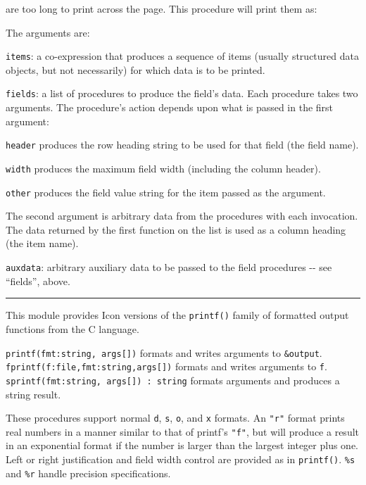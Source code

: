 are too long to print across the page. This procedure will print them
as:


The arguments are:

\texttt{items}: a co-expression that produces a sequence of items
(usually structured data objects, but not necessarily) for which data
is to be printed.

\texttt{fields}: a list of procedures to produce the
field's data. Each procedure takes two arguments. The
procedure's action depends upon what is passed in the
first argument:

\texttt{header} produces the row heading string to be used for that
field (the field name).

\texttt{width} produces the maximum field width (including the column
header).

\texttt{other} produces the field value string for the item passed as
the argument.

The second argument is arbitrary data from the procedures with each
invocation. The data returned by the first function on the list is used
as a column heading (the item name).

\texttt{auxdata}: arbitrary auxiliary data to be passed to the field
procedures -{}- see ``fields'', above.

\vspace{0.25cm}\hrule{}

This module provides Icon versions of the
\texttt{printf()} family of formatted output functions
from the C language.

\texttt{printf(fmt:string, args[])} formats and writes arguments to
\texttt{\&output}.\\
\texttt{fprintf(f:file,fmt:string,args[])} formats and writes arguments
to \texttt{f}.\\
\texttt{sprintf(fmt:string, args[]) : string} formats arguments and
produces a string result.

These procedures support normal \texttt{d}, \texttt{s}, \texttt{o}, and
\texttt{x} formats. An \texttt{"r"} format
prints real numbers in a manner similar to that of
printf's \texttt{"f"}, but
will produce a result in an exponential format if the number is larger
than the largest integer plus one. Left or right justification and
field width control are provided as in \texttt{printf()}. \texttt{\%s}
and \texttt{\%r} handle precision specifications.


